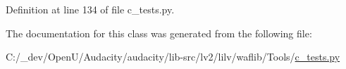 Definition at line 134 of file c\+\_\+tests.\+py.



The documentation for this class was generated from the following file\+:\begin{DoxyCompactItemize}
\item 
C\+:/\+\_\+dev/\+Open\+U/\+Audacity/audacity/lib-\/src/lv2/lilv/waflib/\+Tools/\hyperlink{lilv_2waflib_2_tools_2c__tests_8py}{c\+\_\+tests.\+py}\end{DoxyCompactItemize}
